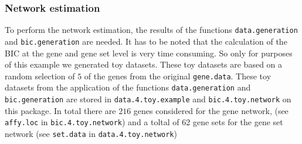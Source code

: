 \documentclass[12pt]{article}
\newcommand{\Robject}[1]{{\texttt{#1}}}
\newcommand{\Rfunction}[1]{{\texttt{#1}}}
\begin{document}
\subsubsection{Network estimation}
To perform the network estimation, the results of the functions \Rfunction{data.generation} and \Rfunction{bic.generation} are needed. It has to be noted that the calculation of the BIC at the gene and gene set level is very time consuming. So only for purposes of this example we generated toy datasets. These toy datasets are based on a random selection of $5$ of the genes from the original \Robject{gene.data}. These toy datasets from the application of the functions \Rfunction{data.generation} and \Rfunction{bic.generation} are stored in \Robject{data.4.toy.example} and \Robject{bic.4.toy.network} on this package. In total there are $216$ genes considered for the gene network, (see \Robject{affy.loc} in \Robject{bic.4.toy.network}) and a toltal of 62 gene sets for the gene set network (see \Robject{set.data} in \Robject{data.4.toy.network})
\footnotesize
\end{document}
